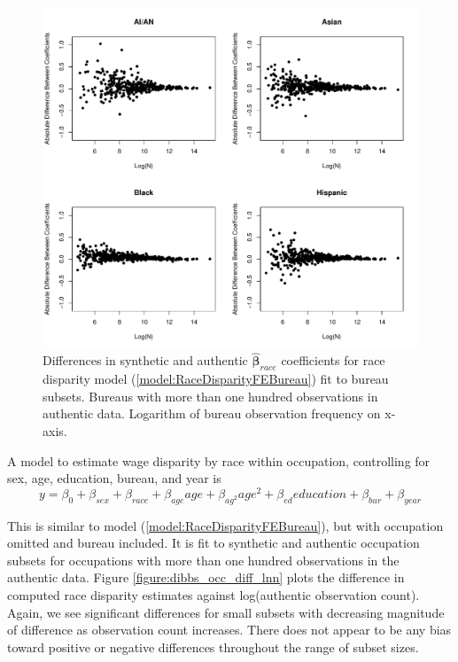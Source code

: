 \documentclass[10pt, letterpaper]{article}
\newcommand{\mest}[1]{\hat{\bm{#1}}}
\begin{document}
\begin{spacing}{1.0}
\begin{figure}[]
    \centering
    \includegraphics[width=6in]{dibbs_agency_diff_lnn.pdf}
    \caption{Differences in synthetic and authentic $\mest{\beta}_{race}$ coefficients for race disparity model (\ref{model:RaceDisparityFEBureau}) fit to bureau subsets.  Bureaus with more than one hundred observations in authentic data.  Logarithm of bureau observation frequency on x-axis.}
    \label{figure:dibbs_agency_diff_lnn}
\end{figure}

\clearpage

A model to estimate wage disparity by race within occupation, controlling for sex, age, education, bureau, and year is\\[-16pt]

\begin{equation} y=\beta_0+\beta_{sex}+\beta_{race}+\beta_{age}age+\beta_{ag^2}age^2+\beta_{ed}education+\beta_{bur}+\beta_{year}
\label{model:RaceDisparityFEOcc}
\end{equation}

This is similar to model (\ref{model:RaceDisparityFEBureau}), but with occupation omitted and bureau included.  It is fit to synthetic and authentic occupation subsets for occupations with more than one hundred observations in the authentic data.  Figure \ref{figure:dibbs_occ_diff_lnn} plots the difference in computed race disparity estimates against log(authentic observation count).  Again, we see significant differences for small subsets with decreasing magnitude of difference as observation count increases.  There does not appear to be any bias toward positive or negative differences throughout the range of subset sizes.\\


\end{spacing}
\end{document}
